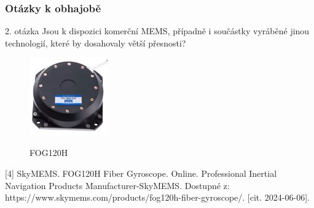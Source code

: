 \documentclass[%
  12pt,       				%
	t,                  %
	aspectratio=1610,   %
	unicode,						%
]{beamer}				    	%
\begin{document}
\begin{frame} 
	\frametitle{Otázky k obhajobě}
		\begin{alertblock}{2. otázka}
		Jsou k dispozici komerční MEMS, případně i součástky vyráběné jinou technologií, které by dosahovaly větší přesnosti?
		\end{alertblock}
	
	
		\begin{figure}%
		\centering
		\includegraphics[width=0.3\textwidth]{obrazky/FOG120H}\par
		FOG120H
		\end{figure}
		\tiny [4] SkyMEMS. FOG120H Fiber Gyroscope. Online. Professional Inertial Navigation Products Manufacturer-SkyMEMS. Dostupné z: https://www.skymems.com/products/fog120h-fiber-gyroscope/. [cit. 2024-06-06].

\end{frame}
\end{document}
